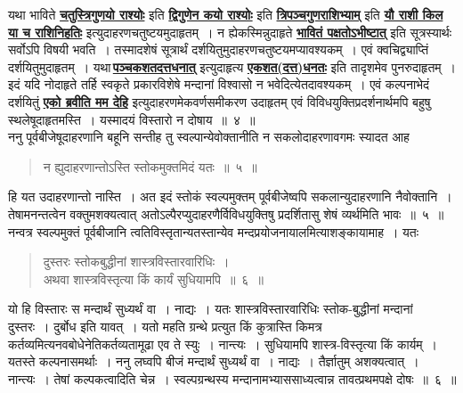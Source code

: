 \documentclass[11pt, openany]{book}
\begin{document}
 यथा भाविते \hyperref[182]{\textbf{चतुस्त्रिगुणयो राश्योः}} इति \hyperref[186]{\textbf{द्विगुणेन कयो राश्योः}} इति \hyperref[187]{\textbf{त्रिपञ्चगुणराशिभ्याम्}} इति \hyperref[184]{\textbf{यौ राशी किल या च राशिनिहतिः}}
इत्युदाहरणचतुष्टयमुदाहृतम्~। न ह्येकस्मिन्नुदाहृते \hyperref[185]{\textbf{भावितं पक्षतोऽभीष्टात्}} इति सूत्रस्यार्थः
सर्वोऽपि विषयी भवति~। तस्मादशेषं सूत्रार्थं
दर्शयितुमुदाहरणचतुष्टयमप्यावश्यकम्~।
एवं क्वचिद्व्याप्तिं दर्शयितुमुदाहृतम्~। यथा\textendash \,\hyperref[96]{\textbf{पञ्चकशतदत्तधनात्}} इत्युदाहृत्य \hyperref[97]{\textbf{एकशत(दत्त)धनतः}} इति तादृशमेव पुनरुदाहृतम्~। इदं यदि नोदाहृते तर्हि स्वकृते प्रकारविशेषे मन्दानां विश्वासो न भवेदित्येतदावश्यकम्~। एवं
कल्पनाभेदं दर्शयितुं \hyperref[93]{\textbf{एको ब्रवीति मम देहि}} इत्युदाहरणमेकवर्णसमीकरण उदाहृतम् एवं
विविधयुक्तिप्रदर्शनार्थमपि बहुषु स्थलेषूदाहृतमस्ति~। यस्मादयं विस्तारो
न दोषाय~॥~४~॥~\\

\vspace{-2mm}
 ननु पूर्वबीजेषूदाहरणानि बहूनि सन्तीह तु स्वल्पान्येवोक्तानीति न सकलोदाहरणावगमः स्यादत आह\textendash
\begin{quote}
    \ab 
     न ह्युदाहरणान्तोऽस्ति स्तोकमुक्तमिदं यतः~॥~५~॥
\end{quote}
 
 हि यत उदाहरणान्तो नास्ति~। अत इदं स्तोकं स्वल्पमुक्तम् पूर्वबीजेष्वपि सकलान्युदाहरणानि नैवोक्तानि~। तेषामनन्तत्वेन वक्तुमशक्यत्वात्
अतोऽल्पैरप्युदाहरणैर्विविधयुक्तिषु प्रदर्शितासु शेषं व्यर्थमिति भावः~॥~५~॥\\

\vspace{-2mm}
 नन्वत्र स्वल्पमुक्तं पूर्वबीजानि त्वतिविस्तृतान्यतस्तान्येव
मन्दप्रयोजनायालमित्याशङ्कायामाह~। यतः\textendash
\begin{quote}
    \ab 
    दुस्तरः स्तोकबुद्धीनां शास्त्रविस्तारवारिधिः~।\\
 अथवा शास्त्रविस्तृत्या किं कार्यं सुधियामपि~॥~६~॥~
\end{quote}

\newpage
 यो हि विस्तारः स मन्दार्थं सुध्यर्थं वा~। नाद्यः~। यतः
शास्त्रविस्तारवारिधिः स्तोक-बुद्धीनां मन्दानां दुस्तरः~। दुर्बोध इति यावत्~। यतो महति
ग्रन्थे प्रत्युत किं कुत्रास्ति किमत्र कर्तव्यमित्यनवबोधेनेतिकर्तव्यतामूढा एव
ते स्युः~। नान्त्यः~। सुधियामपि शास्त्र-विस्तृत्या किं कार्यम्~। यतस्ते
कल्पनासमर्थाः~। ननु
लघ्वपि बीजं मन्दार्थं सुध्यर्थं वा~। नाद्यः~। तैर्ज्ञातुम् अशक्यत्वात्~। नान्त्यः~।
तेषां कल्पकत्वादिति चेन्न~। स्वल्पग्रन्थस्य मन्दानामभ्याससाध्यत्वान्न
तावत्प्रथमपक्षे दोषः~॥~६~॥\\
\end{document}
